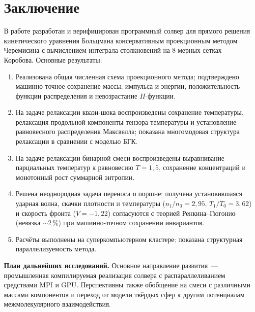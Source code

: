 \chapter*{Заключение}

В работе разработан и верифицирован программный солвер для прямого решения кинетического уравнения Больцмана
консервативным проекционным методом Черемисина с вычислением интеграла столкновений на 8-мерных сетках Коробова.
Основные результаты:
\begin{enumerate}
  \item Реализована общая численная схема проекционного метода; подтверждено машинно-точное сохранение
        массы, импульса и энергии, положительность функции распределения и невозрастание $H$-функции.
  \item На задаче релаксации квази-шока воспроизведены сохранение температуры, релаксация продольной
        компоненты тензора температуры и установление равновесного распределения Максвелла; показана
        многомодовая структура релаксации в сравнении с моделью БГК.
  \item На задаче релаксации бинарной смеси воспроизведены выравнивание парциальных температур к
        равновесию $T=1{,}5$, сохранение концентраций и монотонный рост суммарной энтропии.
  \item Решена неоднородная задача переноса о поршне: получена установившаяся ударная волна, скачки
        плотности и температуры ($n_1/n_0=2{,}95$, $T_1/T_0=3{,}62$) и скорость фронта ($V=-1{,}22$)
        согласуются с теорией Ренкина--Гюгонио (невязка $\sim2\,\%$) при машинно-точном сохранении
        инвариантов.
  \item Расчёты выполнены на суперкомпьютерном кластере; показана структурная параллелизуемость метода.
\end{enumerate}

\textbf{План дальнейших исследований.}
Основное направление развития~--- промышленная компилируемая реализация солвера с распараллеливанием средствами MPI и
GPU.
Перспективны также обобщение на смеси с различными массами компонентов и переход от модели твёрдых сфер к другим
потенциалам межмолекулярного взаимодействия.

